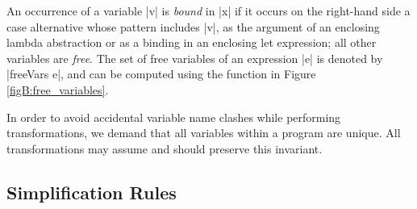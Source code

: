 An occurrence of a variable |v| is \textit{bound} in |x| if it occurs on the right-hand side a case alternative whose pattern includes |v|, as the argument of an enclosing lambda abstraction or as a binding in an enclosing let expression; all other variables are \textit{free}. The set of free variables of an expression |e| is denoted by |freeVars e|, and can be computed using the function in Figure \ref{figB:free_variables}.

In order to avoid accidental variable name clashes while performing transformations, we demand that all variables within a program are unique. All transformations may assume and should preserve this invariant.

\subsection{Simplification Rules}
\label{secB:core_simplify}

